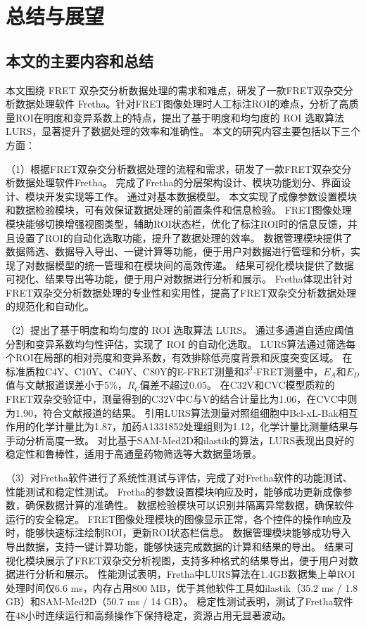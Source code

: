 \chapter{总结与展望}

\section{本文的主要内容和总结}
本文围绕 FRET 双杂交分析数据处理的需求和难点，研发了一款FRET双杂交分析数据处理软件 Fretha。针对FRET图像处理时人工标注ROI的难点，分析了高质量ROI在明度和变异系数上的特点，提出了基于明度和均匀度的 ROI 选取算法LURS，显著提升了数据处理的效率和准确性。
本文的研究内容主要包括以下三个方面：

（1）根据FRET双杂交分析数据处理的流程和需求，研发了一款FRET双杂交分析数据处理软件Fretha。
完成了Fretha的分层架构设计、模块功能划分、界面设计、模块开发实现等工作。
通过对基本数据模型。
本文实现了成像参数设置模块和数据检验模块，可有效保证数据处理的前置条件和信息检验。
FRET图像处理模块能够切换增强视图类型，辅助ROI状态栏，优化了标注ROI时的信息反馈，并且设置了ROI的自动化选取功能，提升了数据处理的效率。
数据管理模块提供了数据筛选、数据导入导出、一键计算等功能，便于用户对数据进行管理和分析，实现了对数据模型的统一管理和在模块间的高效传递。
结果可视化模块提供了数据可视化、结果导出等功能，便于用户对数据进行分析和展示。
Fretha体现出针对FRET双杂交分析数据处理的专业性和实用性，提高了FRET双杂交分析数据处理的规范化和自动化。

（2）提出了基于明度和均匀度的 ROI 选取算法 LURS。
通过多通道自适应阈值分割和变异系数均匀性评估，实现了 ROI 的自动化选取。
LURS算法通过筛选每个ROI在局部的相对亮度和变异系数，有效排除低亮度背景和灰度突变区域。
在标准质粒C4Y、C10Y、C40Y、C80Y的E-FRET测量和$3^3$-FRET测量中，$E_{A}$和$E_{D}$值与文献报道误差小于5\%，$R_{C}$偏差不超过0.05。
在C32V和CVC模型质粒的FRET双杂交验证中，测量得到的C32V中C与V的结合计量比为1.06，在CVC中则为1.90，符合文献报道的结果。
引用LURS算法测量对照组细胞中Bcl-xL-Bak相互作用的化学计量比为1.87，加药A1331852处理组则为1.12，化学计量比测量结果与手动分析高度一致。
对比基于SAM-Med2D和ilastik的算法，LURS表现出良好的稳定性和鲁棒性，适用于高通量药物筛选等大数据量场景。

（3）对Fretha软件进行了系统性测试与评估，完成了对Fretha软件的功能测试、性能测试和稳定性测试。
Fretha的参数设置模块响应及时，能够成功更新成像参数，确保数据计算的准确性。
数据检验模块可以识别并隔离异常数据，确保软件运行的安全稳定。
FRET图像处理模块的图像显示正常，各个控件的操作响应及时，能够快速标注绘制ROI，更新ROI状态栏信息。
数据管理模块能够成功导入导出数据，支持一键计算功能，能够快速完成数据的计算和结果的导出。
结果可视化模块展示了FRET双杂交分析视图，支持多种格式的结果导出，便于用户对数据进行分析和展示。
性能测试表明，Fretha中LURS算法在1.4GB数据集上单ROI处理时间仅6.6 ms，内存占用800 MB，优于其他软件工具如ilastik（35.2 ms / 1.8 GB）和SAM-Med2D（50.7 ms / 14 GB）。
稳定性测试表明，测试了Fretha软件在48小时连续运行和高频操作下保持稳定，资源占用无显著波动。

